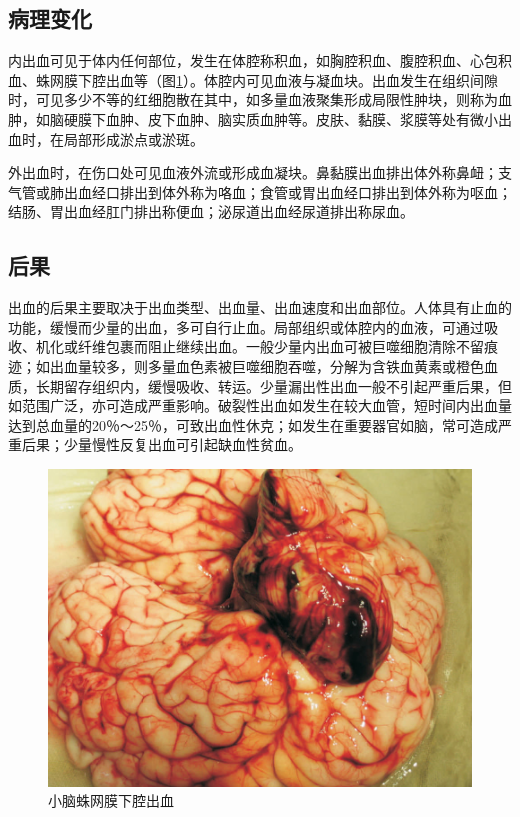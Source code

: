 \subsection{病理变化}

内出血可见于体内任何部位，发生在体腔称积血，如胸腔积血、腹腔积血、心包积血、蛛网膜下腔出血等（图\ref{fig3-4}）。体腔内可见血液与凝血块。出血发生在组织间隙时，可见多少不等的红细胞散在其中，如多量血液聚集形成局限性肿块，则称为血肿，如脑硬膜下血肿、皮下血肿、脑实质血肿等。皮肤、黏膜、浆膜等处有微小出血时，在局部形成淤点或淤斑。

外出血时，在伤口处可见血液外流或形成血凝块。鼻黏膜出血排出体外称鼻衄；支气管或肺出血经口排出到体外称为咯血；食管或胃出血经口排出到体外称为呕血；结肠、胃出血经肛门排出称便血；泌尿道出血经尿道排出称尿血。

\subsection{后果}

出血的后果主要取决于出血类型、出血量、出血速度和出血部位。人体具有止血的功能，缓慢而少量的出血，多可自行止血。局部组织或体腔内的血液，可通过吸收、机化或纤维包裹而阻止继续出血。一般少量内出血可被巨噬细胞清除不留痕迹；如出血量较多，则多量血色素被巨噬细胞吞噬，分解为含铁血黄素或橙色血质，长期留存组织内，缓慢吸收、转运。少量漏出性出血一般不引起严重后果，但如范围广泛，亦可造成严重影响。破裂性出血如发生在较大血管，短时间内出血量达到总血量的20％～25％，可致出血性休克；如发生在重要器官如脑，常可造成严重后果；少量慢性反复出血可引起缺血性贫血。

\begin{figure}[!htbp]
\centering
\includegraphics{./images/Image00037.jpg}
\caption{小脑蛛网膜下腔出血}
\label{fig3-4} 
\end{figure} 


